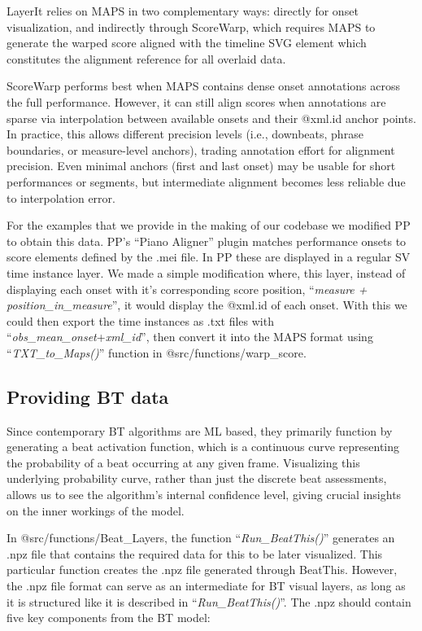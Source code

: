 \noindent LayerIt relies on MAPS in two complementary ways: directly for onset visualization, and indirectly through ScoreWarp, which requires MAPS to generate the warped score aligned with the timeline SVG element which constitutes the alignment reference for all overlaid data.

ScoreWarp performs best when MAPS contains dense onset annotations across the full performance. However, it can still align scores when annotations are sparse via interpolation between available onsets and their @xml.id anchor points. In practice, this allows different precision levels (i.e., downbeats, phrase boundaries, or measure-level anchors), trading annotation effort for alignment precision. Even minimal anchors (first and last onset) may be usable for short performances or segments, but intermediate alignment becomes less reliable due to interpolation error.

 For the examples that we provide in the making of our codebase we modified PP to obtain this data. PP's ``Piano Aligner'' plugin \cite{jiangPIANOPRECISIONADVANCING2025} matches performance onsets to score elements defined by the .mei file. In PP these are displayed in a regular SV time instance layer. We made a simple modification where, this layer, instead of displaying each onset with it's corresponding score position, ``\textit{measure + position\_in\_measure}'', it would display the @xml.id of each onset. With this we could then export the time instances as .txt files with ``\textit{obs\_mean\_onset}+\textit{xml\_id}'', then convert it into the MAPS format using ``\textit{TXT\_to\_Maps()}'' function in @src/functions/warp\_score.
 
\subsection{Providing BT data}
Since contemporary BT algorithms are ML based, they primarily function by generating a beat activation function, which is a continuous curve representing the probability of a beat occurring at any given frame. Visualizing this underlying probability curve, rather than just the discrete beat assessments, allows us to see the algorithm's internal confidence level, giving crucial insights on the inner workings of the model.

In @src/functions/Beat\_Layers, the function ``\textit{Run\_BeatThis()}'' generates an .npz file that contains the required data for this to be later visualized. This particular function creates the .npz file generated through BeatThis. However, the .npz file format can serve as an intermediate for BT visual layers, as long as it is structured like it is described in ``\textit{Run\_BeatThis()}''. The .npz should contain five key components from the BT model:

